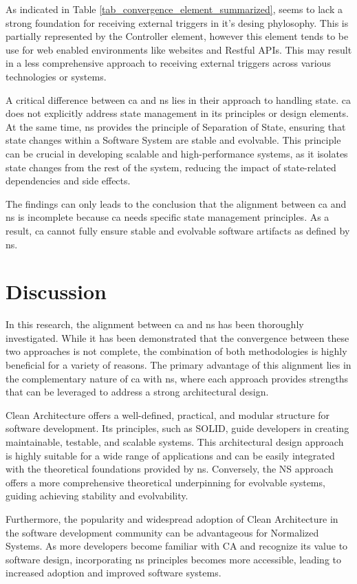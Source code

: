 As indicated in Table \ref{tab_convergence_element_summarized}, seems to lack a strong
foundation for receiving external triggers in it's desing phylosophy. This is partially
represented by the Controller element, however this element tends to be use for web
enabled environments like websites and Restful APIs. This may result in a less
comprehensive approach to receiving external triggers across various technologies or
systems.

A critical difference between \gls{ca} and \gls{ns} lies in their approach to handling
state. \gls{ca} does not explicitly address state management in its principles or design
elements. At the same time, \gls{ns} provides the principle of Separation of State,
ensuring that state changes within a Software System are stable and evolvable. This
principle can be crucial in developing scalable and high-performance systems, as it
isolates state changes from the rest of the system, reducing the impact of state-related
dependencies and side effects. 

The findings can only leads to the conclusion that the alignment between \gls{ca} and
\gls{ns} is incomplete because \gls{ca} needs specific state management principles. As a
result, \gls{ca} cannot fully ensure stable and evolvable software artifacts as defined by
\gls{ns}.


\section{Discussion}

In this research, the alignment between \gls{ca} and \gls{ns} has been thoroughly
investigated. While it has been demonstrated that the convergence between these two
approaches is not complete, the combination of both methodologies is highly beneficial for
a variety of reasons. The primary advantage of this alignment lies in the complementary
nature of \gls{ca} with \gls{ns}, where each approach provides strengths that can be
leveraged to address a strong architectural design. 

Clean Architecture offers a well-defined, practical, and modular structure for software
development. Its principles, such as SOLID, guide developers in creating maintainable,
testable, and scalable systems. This architectural design approach is highly suitable for
a wide range of applications and can be easily integrated with the theoretical foundations
provided by \gls{ns}. Conversely, the NS approach offers a more comprehensive theoretical
underpinning for evolvable systems, guiding achieving stability and evolvability.

Furthermore, the popularity and widespread adoption of Clean Architecture in the software
development community can be advantageous for Normalized Systems. As more developers
become familiar with CA and recognize its value to software design, incorporating \gls{ns}
principles becomes more accessible, leading to increased adoption and improved software
systems.



